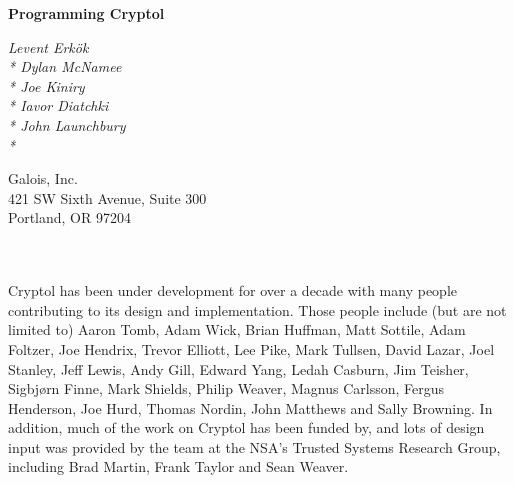 \noindent
\begin{center}
{\LARGE \bf Programming Cryptol}

{\it Levent Erkök\\*
Dylan McNamee \\*
Joe Kiniry \\*
Iavor Diatchki \\*
John Launchbury \\*
}

\end{center}

\vspace{0.5in}
\noindent
Galois, Inc.\\
421 SW Sixth Avenue, Suite 300 \\
Portland, OR 97204

\pagebreak
{}\\
\\
\noindent
Cryptol has been under development for over a decade with many people
contributing to its design and implementation. Those people include (but are
not limited to) Aaron Tomb, Adam Wick, Brian Huffman, Matt Sottile, Adam
Foltzer, Joe Hendrix, Trevor Elliott, Lee Pike, Mark Tullsen, David Lazar, Joel
Stanley, Jeff Lewis, Andy Gill, Edward Yang, Ledah Casburn, Jim Teisher,
Sigbjørn Finne, Mark Shields, Philip Weaver, Magnus Carlsson, Fergus Henderson,
Joe Hurd, Thomas Nordin, John Matthews and Sally Browning. In addition, much of
the work on Cryptol has been funded by, and lots of design input was provided by
the team at the NSA's Trusted Systems Research Group, including Brad Martin,
Frank Taylor and Sean Weaver.

\vspace{1in}
\pagebreak
